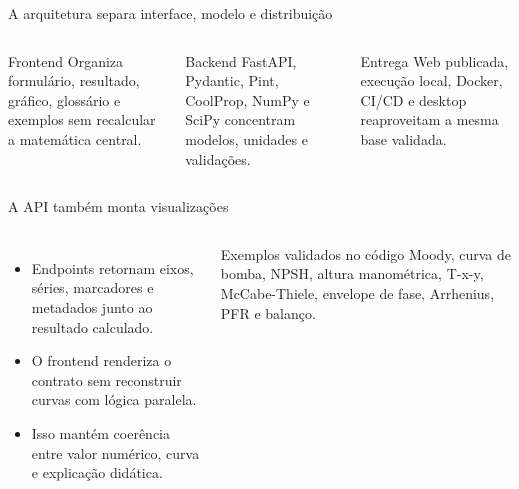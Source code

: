 \begin{frame}{A arquitetura separa interface, modelo e distribuição}
  \begin{columns}[T,onlytextwidth]
      \begin{block}{Frontend}
        Organiza formulário, resultado, gráfico, glossário e exemplos sem recalcular a matemática central.
      \end{block}
      \begin{block}{Backend}
        FastAPI, Pydantic, Pint, CoolProp, NumPy e SciPy concentram modelos, unidades e validações.
      \end{block}
      \begin{block}{Entrega}
        Web publicada, execução local, Docker, CI/CD e desktop reaproveitam a mesma base validada.
      \end{block}
  \end{columns}
\end{frame}

\begin{frame}{A API também monta visualizações}
  \begin{columns}[T,onlytextwidth]
      \begin{itemize}
        \item Endpoints retornam eixos, séries, marcadores e metadados junto ao resultado calculado.
        \item O frontend renderiza o contrato sem reconstruir curvas com lógica paralela.
        \item Isso mantém coerência entre valor numérico, curva e explicação didática.
      \end{itemize}
      \begin{block}{Exemplos validados no código}
        Moody, curva de bomba, NPSH, altura manométrica, T-x-y, McCabe-Thiele, envelope de fase, Arrhenius, PFR e balanço.
      \end{block}
  \end{columns}
\end{frame}

